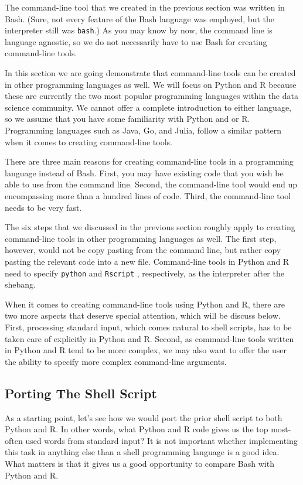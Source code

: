 \documentclass[
]{book}
\theoremstyle{definition}
\theoremstyle{definition}
\theoremstyle{definition}
\theoremstyle{remark}
\begin{document}
The command-line tool that we created in the previous section was written in Bash. (Sure, not every feature of the Bash language was employed, but the interpreter still was \texttt{bash}.) As you may know by now, the command line is language agnostic, so we do not necessarily have to use Bash for creating command-line tools.

In this section we are going demonstrate that command-line tools can be created in other programming languages as well. We will focus on Python and R because these are currently the two most popular programming languages within the data science community. We cannot offer a complete introduction to either language, so we assume that you have some familiarity with Python and or R. Programming languages such as Java, Go, and Julia, follow a similar pattern when it comes to creating command-line tools.

There are three main reasons for creating command-line tools in a programming language instead of Bash. First, you may have existing code that you wish be able to use from the command line. Second, the command-line tool would end up encompassing more than a hundred lines of code. Third, the command-line tool needs to be very fast.

The six steps that we discussed in the previous section roughly apply to creating command-line tools in other programming languages as well. The first step, however, would not be copy pasting from the command line, but rather copy pasting the relevant code into a new file. Command-line tools in Python and R need to specify \texttt{python} \citep{python} and \texttt{Rscript} \citep{R}, respectively, as the interpreter after the shebang.

When it comes to creating command-line tools using Python and R, there are two more aspects that deserve special attention, which will be discuss below. First, processing standard input, which comes natural to shell scripts, has to be taken care of explicitly in Python and R. Second, as command-line tools written in Python and R tend to be more complex, we may also want to offer the user the ability to specify more complex command-line arguments.

\hypertarget{porting-the-shell-script}{%
\subsection{Porting The Shell Script}\label{porting-the-shell-script}}

As a starting point, let's see how we would port the prior shell script to both Python and R. In other words, what Python and R code gives us the top most-often used words from standard input? It is not important whether implementing this task in anything else than a shell programming language is a good idea. What matters is that it gives us a good opportunity to compare Bash with Python and R.
\end{document}
